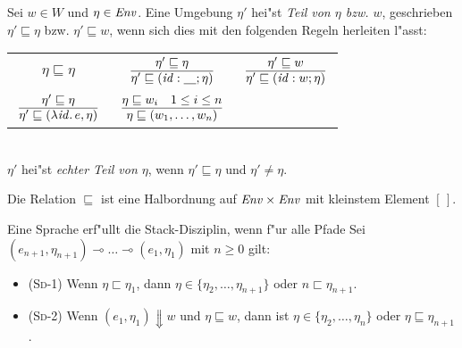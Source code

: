 \documentclass[12pt,fleqn,a4paper]{article}
\newcommand{\RN}[1]{\mbox{\textsc{(#1)}}}
\begin{document}
\begin{definition}
  Sei $w \in W$ und $\eta \in {\text{\it Env\/}}$. Eine Umgebung $\eta'$ hei"st \emph{Teil von $\eta$ bzw. $w$},
  geschrieben $\eta' \sqsubseteq \eta$ bzw. $\eta' \sqsubseteq w$, wenn sich dies mit den folgenden
  Regeln herleiten l"asst: \\[5mm]
  \begin{tabular}{ccc}
    $\eta \sqsubseteq \eta$
    & $\regel{\eta' \sqsubseteq \eta}{\eta' \sqsubseteq (\id:\underline{\quad};\eta)}$
    & $\regel{\eta' \sqsubseteq w}{\eta' \sqsubseteq (\id:w;\eta)}$ \\[3mm]
    $\regel{\eta' \sqsubseteq \eta}{\eta' \sqsubseteq (\abstr{\id}{e},\eta)}$
    & $\regel{\eta \sqsubseteq w_i \quad 1 \le i \le n}{\eta \sqsubseteq (w_1,\ldots,w_n)}$ \\[3mm]
  \end{tabular} \\[2mm]
  $\eta'$ hei"st \emph{echter Teil von $\eta$}, wenn $\eta' \sqsubseteq \eta$ und $\eta' \ne \eta$.
\end{definition}

\begin{lemma}
  Die Relation $\sqsubseteq$ ist eine Halbordnung auf ${\text{\it Env\/}} \times {\text{\it Env\/}}$ mit kleinstem Element $[\,]$.
\end{lemma}



\begin{definition}
  Eine Sprache erf"ullt die Stack-Disziplin, wenn f"ur alle Pfade
  Sei $(e_{n+1},\eta_{n+1}) \multimap \ldots \multimap (e_{1},\eta_{1})$  mit $n \ge 0$ gilt:
  \begin{itemize}
  \item \RN{Sd-1} Wenn $\eta \sqsubset \eta_1$, dann $\eta \in \{\eta_2,\ldots,\eta_{n+1}\}$
    oder $n\sqsubset\eta_{n+1}$.
  \item \RN{Sd-2} Wenn $(e_1,\eta_1) \Downarrow w$ und $\eta \sqsubseteq w$, dann ist
    $\eta \in \{\eta_2,\ldots,\eta_n\}$ oder $\eta \sqsubseteq \eta_{n+1}$.
  \end{itemize}
\end{definition}
\end{document}
